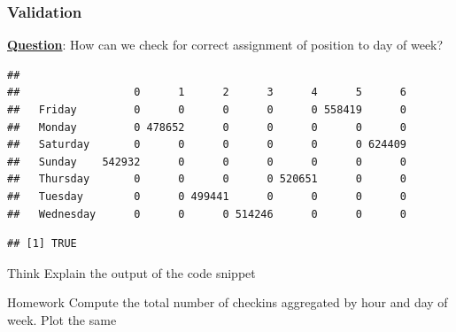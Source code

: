 \subsubsection{Validation}
\noindent \textbf{\underline{Question}}: How can we check for correct assignment of position to day of week?
\begin{knitrout}
\color{fgcolor}\begin{kframe}
\begin{alltt}
\hlopt{$}\hlopt{$}
\end{alltt}
\begin{verbatim}
##            
##                  0      1      2      3      4      5      6
##   Friday         0      0      0      0      0 558419      0
##   Monday         0 478652      0      0      0      0      0
##   Saturday       0      0      0      0      0      0 624409
##   Sunday    542932      0      0      0      0      0      0
##   Thursday       0      0      0      0 520651      0      0
##   Tuesday        0      0 499441      0      0      0      0
##   Wednesday      0      0      0 514246      0      0      0
\end{verbatim}
\begin{alltt}
\hlstd{(}\hlopt{$}\hlopt{$} \hlopt{==}
  \hlstd{(checkins)[}\hlstd{]}
\end{alltt}
\begin{verbatim}
## [1] TRUE
\end{verbatim}
\begin{alltt}
\end{alltt}
\end{kframe}
\end{knitrout}

\begin{DIY}{Think}
\noindent Explain the output of the code snippet 
\end{DIY}

\begin{DIY}{Homework}
\noindent Compute the total number of checkins aggregated by hour and day of week. Plot the same 
\end{DIY}

\newpage
